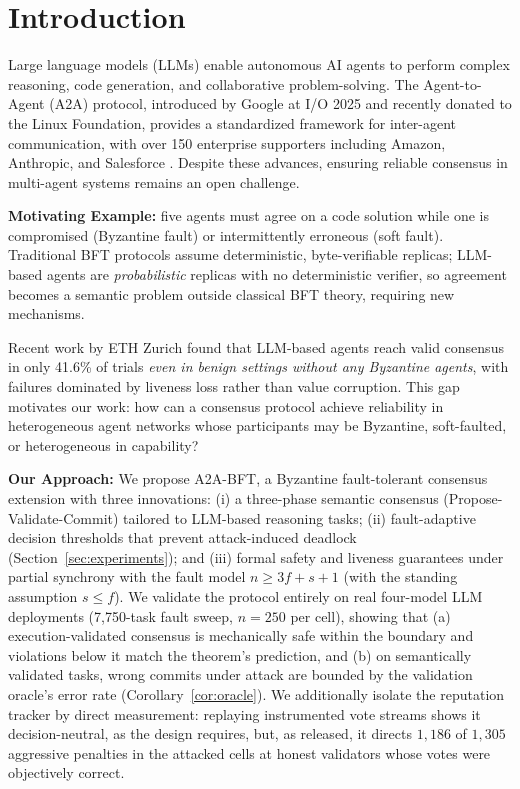 \documentclass{article}
\begin{document}
\section{Introduction}

Large language models (LLMs) enable autonomous AI agents to perform complex reasoning, code generation, and collaborative problem-solving. The Agent-to-Agent (A2A) protocol, introduced by Google at I/O 2025 and recently donated to the Linux Foundation, provides a standardized framework for inter-agent communication, with over 150 enterprise supporters including Amazon, Anthropic, and Salesforce \citep{a2a_protocol_2025}. Despite these advances, ensuring reliable consensus in multi-agent systems remains an open challenge.

\textbf{Motivating Example:} five agents must agree on a code solution while one is compromised (Byzantine fault) or intermittently erroneous (soft fault). Traditional BFT protocols assume deterministic, byte-verifiable replicas; LLM-based agents are \emph{probabilistic} replicas with no deterministic verifier, so agreement becomes a semantic problem outside classical BFT theory, requiring new mechanisms.

Recent work by ETH Zurich \citep{a2a_sim_2026} found that LLM-based agents reach valid consensus in only 41.6\% of trials \emph{even in benign settings without any Byzantine agents}, with failures dominated by liveness loss rather than value corruption. This gap motivates our work: how can a consensus protocol achieve reliability in heterogeneous agent networks whose participants may be Byzantine, soft-faulted, or heterogeneous in capability?

\textbf{Our Approach:} We propose A2A-BFT, a Byzantine fault-tolerant consensus extension with three innovations: (i) a three-phase semantic consensus (Propose-Validate-Commit) tailored to LLM-based reasoning tasks; (ii) fault-adaptive decision thresholds that prevent attack-induced deadlock (Section~\ref{sec:experiments}); and (iii) formal safety and liveness guarantees under partial synchrony with the fault model $n \geq 3f + s + 1$ (with the standing assumption $s \leq f$). We validate the protocol entirely on real four-model LLM deployments (7{,}750-task fault sweep, $n{=}250$ per cell), showing that (a) execution-validated consensus is mechanically safe within the boundary and violations below it match the theorem's prediction, and (b) on semantically validated tasks, wrong commits under attack are bounded by the validation oracle's error rate (Corollary~\ref{cor:oracle}). We additionally isolate the reputation tracker by direct measurement: replaying instrumented vote streams shows it decision-neutral, as the design requires, but, as released, it directs $1{,}186$ of $1{,}305$ aggressive penalties in the attacked cells at honest validators whose votes were objectively correct.
\end{document}
